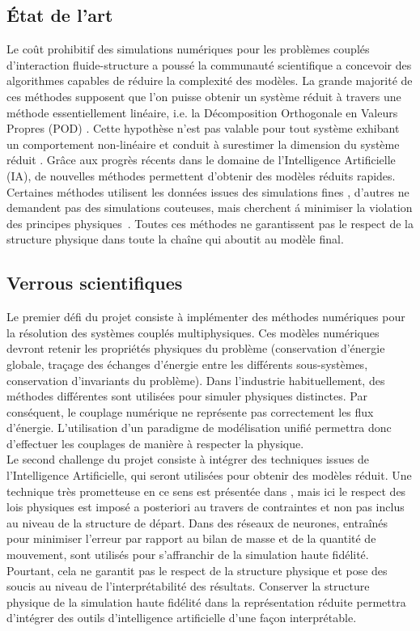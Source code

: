 \documentclass[french]{article}
\begin{document}
\subsection{État de l'art}
Le coût prohibitif des simulations numériques pour les problèmes couplés d'interaction fluide-structure
a poussé la communauté scientifique a concevoir des algorithmes capables de réduire la complexité des modèles. La grande majorité de ces méthodes supposent que l'on puisse obtenir un système réduit à travers une méthode essentiellement linéaire, i.e. la Décomposition Orthogonale en Valeurs Propres (POD) \cite{shinde2019,tello2020fluid}. Cette hypothèse n’est pas valable pour tout
système exhibant un comportement non-linéaire et conduit à surestimer la dimension
du système réduit \cite{kerschen2005}. Grâce aux progrès récents dans le domaine de l’Intelligence
Artificielle (IA), de nouvelles méthodes permettent d’obtenir des modèles réduits rapides. Certaines
méthodes utilisent les données issues des simulations fines \cite{lee2020}, d'autres ne demandent pas des simulations couteuses, mais cherchent \'a minimiser la violation des principes physiques~\cite{sun2020physics}.  Toutes ces méthodes ne garantissent pas le respect de la structure physique dans toute la chaîne qui aboutit au modèle final. 


\subsection{Verrous scientifiques}


Le premier défi du projet consiste à implémenter des méthodes numériques pour la résolution des systèmes couplés multiphysiques. Ces modèles numériques devront retenir les propriétés physiques du problème (conservation d’énergie globale, traçage des échanges d’énergie entre les différents sous-systèmes, conservation d’invariants du problème). Dans l'industrie habituellement, des méthodes différentes sont utilisées pour simuler physiques distinctes. Par conséquent, le couplage numérique ne représente pas correctement les flux d’énergie. L’utilisation d’un paradigme de modélisation unifié permettra donc d’effectuer les couplages de manière à respecter la physique. \\

Le second challenge du projet consiste à intégrer des techniques issues de l’Intelligence
Artificielle, qui seront utilisées pour obtenir des modèles réduit. Une technique très prometteuse en ce sens est présentée dans \cite{lee2020}, mais ici le respect des lois physiques est imposé a posteriori au travers de contraintes et non pas inclus au niveau de la structure de départ. Dans \cite{sun2020physics} des réseaux de neurones, entraînés pour minimiser l’erreur par rapport au bilan de masse et de la quantité de mouvement, sont utilisés pour s’affranchir de la simulation haute fidélité. Pourtant, cela ne garantit pas le respect de la structure physique et pose des soucis au niveau de l’interprétabilité des résultats. Conserver la structure physique de la simulation haute fidélité dans la représentation réduite permettra d’intégrer des outils d’intelligence artificielle d’une façon interprétable. \\
\end{document}
